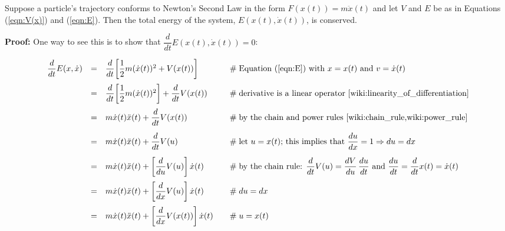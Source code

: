 \begin{theorem}
Suppose a particle's trajectory conforms to Newton’s Second Law 
in the form $F(x(t)) = m\ddot{x}(t)$ and let $V$ and $E$ be as 
in Equations (\ref{eqn:V(x)}) and (\ref{eqn:E}). Then the total 
energy of the system, $E(x(t),\dot{x}(t))$, is conserved. 

\bigskip
\noindent
{\bf Proof:} One way to see this is to show that 
$\dfrac{d}{dt}E(x(t),\dot{x}(t)) = 0$:

\begin{equation*}
\begin{array}{llll}
\dfrac{d}{dt} E(x,\dot{x})
&=& \dfrac{d}{dt} \bigg [\dfrac{1}{2}m(\dot{x}(t))^{2} + V(x(t)) \bigg ]	
		&\hspace{1em} \mathrel{\#} \text{Equation (\ref{eqn:E}) with $x = x(t)$ 
		                                 and $v = \dot{x}(t)$} \\	
[12pt]
&=& \dfrac{d}{dt} \bigg [ \dfrac{1}{2}m(\dot{x}(t))^{2} \bigg ] + \dfrac{d}{dt} V(x(t))
		&\hspace{1em} \mathrel{\#} \text{derivative is a linear operator \cite{wiki:linearity_of_differentiation}} \\
[12pt]
&=& m\dot{x}(t)\ddot{x}(t) + \dfrac{d}{dt} V(x(t))
		&\hspace{1em} \mathrel{\#} \text{by the chain and power rules \cite{wiki:chain_rule,wiki:power_rule}} \\
[12pt]
&=& m\dot{x}(t)\ddot{x}(t) + \dfrac{d}{dt} V(u)
		&\hspace{1em} \mathrel{\#} \text{let $u = x(t)$; this implies that 
		                                 $\dfrac{du}{dx} = 1 \Rightarrow du = dx$} \\
[12pt]
&=& m\dot{x}(t)\ddot{x}(t) + \left [\dfrac{d}{du}  V(u) \right ] \dot{x}(t)
		&\hspace{1em} \mathrel{\#} \text{by the chain rule: 
								         $\dfrac{d}{dt} V(u) = 
					                     \dfrac{dV}{du} \, \dfrac{du}{dt}$
					                     and 
							             $\dfrac{du}{dt}     = 
							             \dfrac{d}{dt} x(t)  = 
							             \dot{x}(t)$} \\
[12pt]
&=& m\dot{x}(t)\ddot{x}(t) + \left [ \dfrac{d}{dx}V(u) \right ] \dot{x}(t)
		&\hspace{1em} \mathrel{\#} du = dx \\
[12pt]
&=& m\dot{x}(t)\ddot{x}(t) + \left [ \dfrac{d}{dx}V(x(t)) \right ] \dot{x}(t)
		&\hspace{1em} \mathrel{\#} u = x(t) \\

\end{array}
\end{equation*}
\end{theorem}
